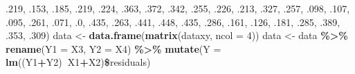\documentclass[]{article}
\newenvironment{Shaded}{\begin{snugshade}}{\end{snugshade}}
\newcommand{\KeywordTok}[1]{\textcolor[rgb]{0.13,0.29,0.53}{\textbf{#1}}}
\newcommand{\DataTypeTok}[1]{\textcolor[rgb]{0.13,0.29,0.53}{#1}}
\newcommand{\DecValTok}[1]{\textcolor[rgb]{0.00,0.00,0.81}{#1}}
\newcommand{\StringTok}[1]{\textcolor[rgb]{0.31,0.60,0.02}{#1}}
\newcommand{\OperatorTok}[1]{\textcolor[rgb]{0.81,0.36,0.00}{\textbf{#1}}}
\newcommand{\NormalTok}[1]{#1}
\begin{document}
\begin{Shaded}
\begin{Highlighting}[]
\NormalTok{           .}\DecValTok{219}\NormalTok{, .}\DecValTok{153}\NormalTok{, .}\DecValTok{185}\NormalTok{, .}\DecValTok{219}\NormalTok{, .}\DecValTok{224}\NormalTok{, .}\DecValTok{363}\NormalTok{, .}\DecValTok{372}\NormalTok{, .}\DecValTok{342}\NormalTok{,}
\NormalTok{           .}\DecValTok{255}\NormalTok{, .}\DecValTok{226}\NormalTok{, .}\DecValTok{213}\NormalTok{, .}\DecValTok{327}\NormalTok{, .}\DecValTok{257}\NormalTok{, .}\DecValTok{098}\NormalTok{, .}\DecValTok{107}\NormalTok{, .}\DecValTok{095}\NormalTok{,}
\NormalTok{           .}\DecValTok{261}\NormalTok{, .}\DecValTok{071}\NormalTok{, .}\DecValTok{0}\NormalTok{, .}\DecValTok{435}\NormalTok{, .}\DecValTok{263}\NormalTok{, .}\DecValTok{441}\NormalTok{, .}\DecValTok{448}\NormalTok{, .}\DecValTok{435}\NormalTok{,}
\NormalTok{           .}\DecValTok{286}\NormalTok{, .}\DecValTok{161}\NormalTok{, .}\DecValTok{126}\NormalTok{, .}\DecValTok{181}\NormalTok{, .}\DecValTok{285}\NormalTok{, .}\DecValTok{389}\NormalTok{, .}\DecValTok{353}\NormalTok{, .}\DecValTok{309}\NormalTok{)}
\NormalTok{data <-}\StringTok{ }\KeywordTok{data.frame}\NormalTok{(}\KeywordTok{matrix}\NormalTok{(dataxy, }\DataTypeTok{ncol =} \DecValTok{4}\NormalTok{))}
\NormalTok{data <-}\StringTok{ }\NormalTok{data }\OperatorTok{\%>\%}
\StringTok{  }\KeywordTok{rename}\NormalTok{(}\DataTypeTok{Y1 =}\NormalTok{ X3, }\DataTypeTok{Y2 =}\NormalTok{ X4) }\OperatorTok{\%>\%}
\StringTok{  }\KeywordTok{mutate}\NormalTok{(}\DataTypeTok{Y =} \KeywordTok{lm}\NormalTok{((Y1}\OperatorTok{+}\NormalTok{Y2)}\OperatorTok{~}\NormalTok{X1}\OperatorTok{+}\NormalTok{X2)}\OperatorTok{\$}\NormalTok{residuals)}
\end{Highlighting}
\end{Shaded}
\end{document}
